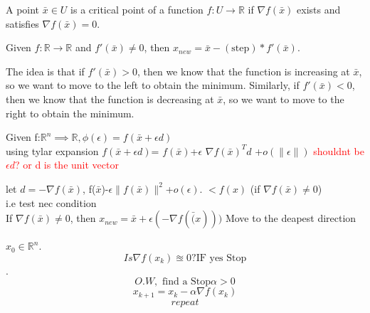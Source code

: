 \begin{definition}
    A point $\bar x \in U$ is a critical point of a function $f: U \rightarrow \mathbb R$ if $\nabla f(\bar x)$ exists and satisfies $\nabla f(\bar x) = 0$.
\end{definition}

\begin{problem}
    Given $f: \mathbb{R}\rightarrow \mathbb{R}$ and $f'(\bar{x})\neq 0$, then $x_{new}=\bar{x}-(\text{step})*f'(\bar{x})$.
    
    The idea is that if $f'(\bar x) > 0$, then we know that the function is increasing at $\bar x$, so we want to move to the left to obtain the minimum. Similarly, if $f'(\bar x) < 0$, then we know that the function is decreasing at $\bar x$, so we want to move to the right to obtain the minimum.
\end{problem}

\begin{problem}
    Given f:$\mathbb{R}^n \implies \mathbb{R}, \phi(\epsilon)=f(\bar{x}+\epsilon d)$ 
    \\ using tylar expansion 
    $f(\bar{x}+\epsilon d)$=
    $f(\bar{x})$+$\epsilon$ $\nabla f(\bar{x})^T d$ +$o(\|\epsilon\|)$ \textcolor{red}{shouldnt be $\epsilon d$? or d is the unit vector}

    let $d=-\nabla f(\bar{x})$, f($\bar{x}$)-$\epsilon \| f(\bar{x})\|^2$+$o(\epsilon)$.
    $<f(x)$ (if $\nabla f(\bar{x})\neq 0$)
    \\ i.e test nec condition 
    \\ If $\nabla f(\bar{x})\neq 0$, then $x_{new}=\bar{x}+\epsilon(-\nabla f(\bar(x)))$
    Move to the deapest direction


    
\end{problem}

\begin{definition}
    $x_{0} \in \mathbb{R}^n$.   
    $$Is \nabla f(x_k)\approxeq 0?\text{IF yes Stop}$$.
    $$O.W, \text{ find a Stop} \alpha >0$$
    $$x_{k+1}=x_k-\alpha\nabla f(x_k)$$
    $$repeat$$
\end{definition}


